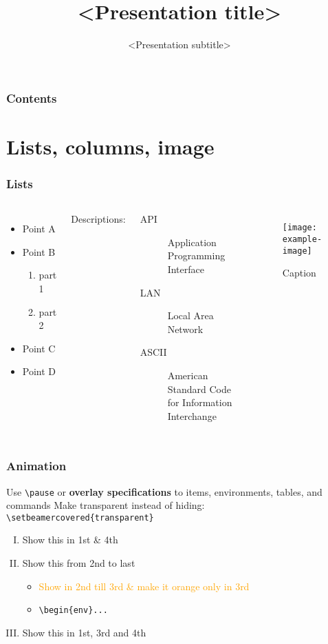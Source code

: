 \documentclass[aspectratio=169]{beamer}
\title{<Presentation title>}
\subtitle{<Presentation subtitle>}
\institute{LULEÅ UNIVERSITY OF TECHNOLOGY}
\begin{document}
\titlepage

\begin{frame}
  \frametitle{Contents}
  \tableofcontents
\end{frame}

\section{Lists, columns, image}
\begin{frame}[t]
  \frametitle{Lists}
  \begin{columns}
    \begin{itemize}
      \item Point A
      \item Point B
        \begin{enumerate}
          \item part 1
          \item part 2
        \end{enumerate}
      \item Point C
      \item Point D
    \end{itemize}
    Descriptions:
    \begin{description}
      \item[API] Application Programming Interface
      \item[LAN] Local Area Network
      \item[ASCII] American Standard Code for Information Interchange
    \end{description}

    \begin{figure}
      \texttt{[image: example-image]}
      \caption{Caption}
    \end{figure}
  \end{columns}

\end{frame}

\begin{frame}
\frametitle{Animation}
Use \texttt{\textbackslash pause} or \textbf{overlay specifications} to items, environments, tables, and commands
Make transparent instead of hiding: \texttt{\textbackslash setbeamercovered\{transparent\}}
\begin{enumerate}[(I)]
  \item<1,4> Show this in 1st \& 4th
  \item<2-> Show this from 2nd to last
    \begin{itemize}
      \item<2-3> \textcolor<3>{orange}{Show in 2nd till 3rd \& make it orange only in 3rd}
      \item<3-> \texttt{\textbackslash begin\{env\}<n-m>...}
    \end{itemize}
  \item<1,3-4> Show this in 1st, 3rd and 4th
\end{enumerate}
\end{frame}
\end{document}
